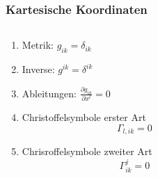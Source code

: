 %
%
%
\bgroup
\begin{frame}[t]
\setlength{\abovedisplayskip}{5pt}
\setlength{\belowdisplayskip}{5pt}
\frametitle{Kartesische Koordinaten}
\vspace{-10pt}
\begin{columns}[t,onlytextwidth]
\begin{column}{0.48\textwidth}
\begin{enumerate}
\item<2-> Metrik: $\displaystyle
g_{ik} = \delta_{ik}
$
\item<3-> Inverse: $\displaystyle
g^{ik} = \delta^{ik}
$
\item<4-> Ableitungen: $\displaystyle
\frac{\partial g_{ik}}{\partial x^l} = 0
$
\item<5-> Christoffelsymbole erster Art
\[
\Gamma_{l,ik} = 0
\]
\item<6-> Chrisroffelsymbole zweiter Art
\[
\Gamma^j_{ik} = 0
\]
\end{enumerate}
\end{column}
\begin{column}{0.48\textwidth}
\end{column}
\end{columns}
\end{frame}
\egroup
